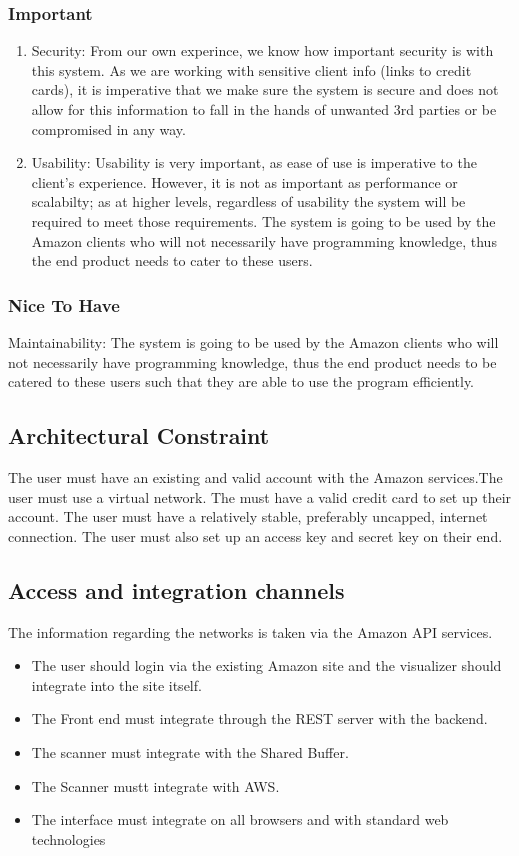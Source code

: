 \documentclass[hidelinks,a4paper,12pt]{article}
\begin{document}
\subsubsection {Important}
\begin{enumerate}  
	\item Security: From our own experince, we know how important security is with this system. As we are working with sensitive client info (links to credit cards), it is imperative that we make sure the system is secure and does not allow for this information to fall in the hands of unwanted 3rd parties or be compromised in any way.
	
	\item Usability: Usability is very important, as ease of use is imperative to the client's experience. However, it is not as important as performance or scalabilty; as at higher levels, regardless of usability the system will be required to meet those requirements. The system is going to be used by the Amazon clients who will not necessarily have programming knowledge, thus the end product needs to cater to these users.
\end{enumerate}	

\subsubsection {Nice To Have}
Maintainability: The system is going to be used by the Amazon clients who will not necessarily have programming knowledge, thus the end product needs to be catered to these users such that they are able to use the program efficiently.
\subsection{Architectural Constraint}
The user must have an existing and valid account with the Amazon services.The user must use a virtual network. The must have a valid credit card to set up their account. The user must have a relatively stable, preferably uncapped, internet connection. The user must also set up an access key and secret key on their end.
\subsection{Access and integration channels}
The information regarding the networks is taken via the Amazon API services.
\begin{itemize}  
	\item The user should login via the existing Amazon site and the visualizer should integrate into the site itself.
	\item The Front end must integrate through the REST server with the backend.
	\item The scanner must integrate with the Shared Buffer.
	\item The Scanner mustt integrate with AWS.
	\item The interface must integrate on all browsers and with standard web technologies
\end{itemize}
\end{document}

